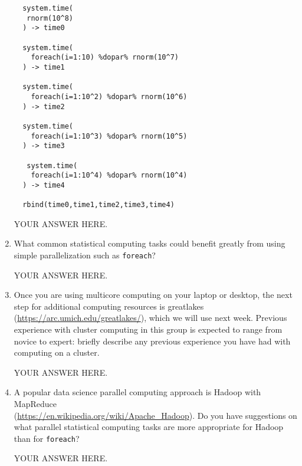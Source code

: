 \documentclass[12pt]{article}
\begin{document}
\begin{enumerate}
\begin{verbatim}
  system.time(
   rnorm(10^8)
  ) -> time0

  system.time(
    foreach(i=1:10) %dopar% rnorm(10^7)
  ) -> time1

  system.time(
    foreach(i=1:10^2) %dopar% rnorm(10^6)
  ) -> time2

  system.time(
    foreach(i=1:10^3) %dopar% rnorm(10^5)
  ) -> time3

   system.time(
    foreach(i=1:10^4) %dopar% rnorm(10^4)
  ) -> time4
  
  rbind(time0,time1,time2,time3,time4)
\end{verbatim}

  YOUR ANSWER HERE.

\item What common statistical computing tasks could benefit greatly from using simple parallelization such as \texttt{foreach}?
  
YOUR ANSWER HERE.

\item Once you are using multicore computing on your laptop or desktop, the next step for additional computing resources is greatlakes (\url{https://arc.umich.edu/greatlakes/}), which we will use next week. Previous experience with cluster computing in this group is expected to range from novice to expert: briefly describe any previous experience you have had with computing on a cluster.

  YOUR ANSWER HERE.

\item A popular data science parallel computing approach is Hadoop with MapReduce\\
(\url{https://en.wikipedia.org/wiki/Apache_Hadoop}). Do you have suggestions on what parallel statistical computing tasks are more appropriate for Hadoop than for \texttt{foreach}?

  YOUR ANSWER HERE.
  
\end{enumerate}
\end{document}
